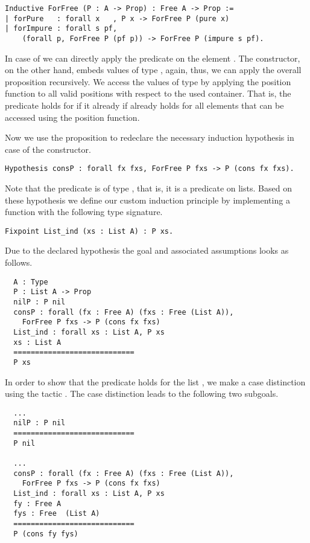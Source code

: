 \begin{verbatim}
Inductive ForFree (P : A -> Prop) : Free A -> Prop :=
| forPure   : forall x   , P x -> ForFree P (pure x)
| forImpure : forall s pf,
    (forall p, ForFree P (pf p)) -> ForFree P (impure s pf).
\end{verbatim}

In case of  we can directly apply the predicate on the
element .
The  constructor, on the other hand, embeds values of
type , again, thus, we can apply the overall proposition
 recursively.
We access the values of type  by applying the position
function to all valid positions with respect to the used container.
That is, the predicate holds for  if it already if
 already holds for all elements that can be accessed
using the position function.

Now we use the proposition  to redeclare the necessary
induction hypothesis in case of the  constructor.

\begin{verbatim}
Hypothesis consP : forall fx fxs, ForFree P fxs -> P (cons fx fxs).
\end{verbatim}

Note that the predicate  is of type ,
that is, it is a predicate on lists.
Based on these hypothesis we define our custom induction principle by
implementing a function with the following type signature.

\begin{verbatim}
Fixpoint List_ind (xs : List A) : P xs.
\end{verbatim}

\noindent%
Due to the declared hypothesis the goal and associated assumptions
looks as follows.

\begin{verbatim}
  A : Type
  P : List A -> Prop
  nilP : P nil
  consP : forall (fx : Free A) (fxs : Free (List A)),
    ForFree P fxs -> P (cons fx fxs)
  List_ind : forall xs : List A, P xs
  xs : List A
  ============================
  P xs
\end{verbatim}

In order to show that the predicate  holds for the list
, we make a case distinction using the tactic .
The case distinction leads to the following two subgoals.

\begin{verbatim}
  ...
  nilP : P nil
  ============================
  P nil

  ...
  consP : forall (fx : Free A) (fxs : Free (List A)),
    ForFree P fxs -> P (cons fx fxs)
  List_ind : forall xs : List A, P xs
  fy : Free A
  fys : Free  (List A)
  ============================
  P (cons fy fys)
\end{verbatim}


